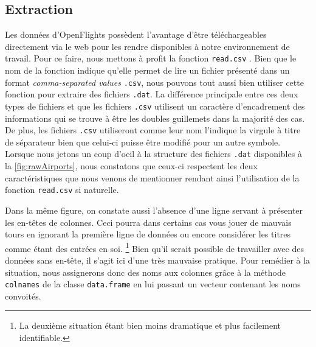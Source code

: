\subsection{Extraction}
	\label{subsec:extraction}

Les données d'OpenFlights possèdent l'avantage d'être téléchargeables directement via le web pour les rendre disponibles à notre environnement de travail. Pour ce faire, nous mettons à profit la fonction \texttt{read.csv} \cite{Rfunction:read.csv}. Bien que le nom de la fonction indique qu'elle permet de lire un fichier présenté dans un format \emph{comma-separated values} \texttt{.csv}, nous pouvons tout aussi bien utiliser cette fonction pour extraire des fichiers \texttt{.dat}. La différence principale entre ces deux types de fichiers et que les fichiers \texttt{.csv} utilisent un caractère d'encadrement des informations qui se trouve à être les doubles guillemets dans la majorité des cas. De plus, les fichiers \texttt{.csv} utiliseront comme leur nom l'indique la virgule à titre de séparateur bien que celui-ci puisse être modifié pour un autre symbole.\cite{CSVDAT} Lorsque nous jetons un coup d'oeil à la structure des fichiers \texttt{.dat} disponibles à la \autoref{fig:rawAirports}, nous constatons que ceux-ci respectent les deux caractéristiques que nous venons de mentionner rendant ainsi l'utilisation de la fonction \texttt{read.csv} si naturelle. \\


Dans la même figure, on constate aussi l'absence d'une ligne servant à présenter les en-têtes de colonnes. Ceci pourra dans certains cas vous jouer de mauvais tours en ignorant la première ligne de données ou encore considérer les titres comme étant des entrées en soi. \footnote{La deuxième situation étant bien moins dramatique et plus facilement identifiable.}  Bien qu'il serait possible de travailler avec des données sans en-tête, il s'agit ici d'une très mauvaise pratique. Pour remédier à la situation, nous assignerons donc des noms aux colonnes grâce à la méthode \texttt{colnames} de la classe \texttt{data.frame} en lui passant un vecteur contenant les noms convoités. \\

